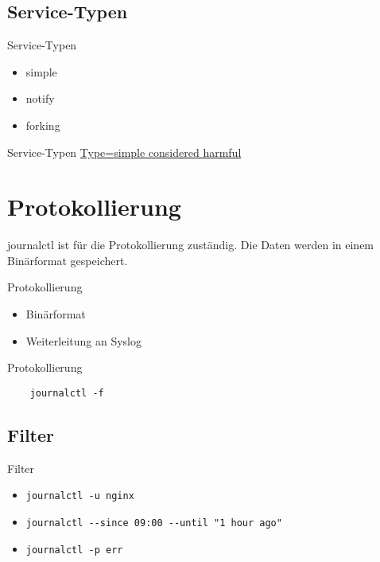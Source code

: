 \subsection{Service-Typen}

\begin{frame}{Service-Typen}
\begin{itemize}
\item simple
\item notify
\item forking
\end{itemize}
\end{frame}

\begin{frame}{Service-Typen}
\href{https://www.lucas-nussbaum.net/blog/?p=877}{Type=simple considered harmful}
\end{frame}

\section{Protokollierung}

journalctl ist für die Protokollierung zuständig. Die Daten werden in einem Binärformat gespeichert.

\begin{frame}{Protokollierung}
\begin{itemize}
\item Binärformat
\item Weiterleitung an Syslog
\end{itemize}
\end{frame}

\begin{frame}[fragile]{Protokollierung}
  \begin{lstlisting}
    journalctl -f
    \end{lstlisting}
\end{frame}
  
\subsection{Filter}

\begin{frame}[fragile]{Filter}
  \begin{itemize}
  \item[Service] \verb|journalctl -u nginx|
  \item[Zeit] \verb|journalctl --since 09:00 --until "1 hour ago"|
  \item[Priorität] \verb|journalctl -p err|
  \end{itemize}
\end{frame}

